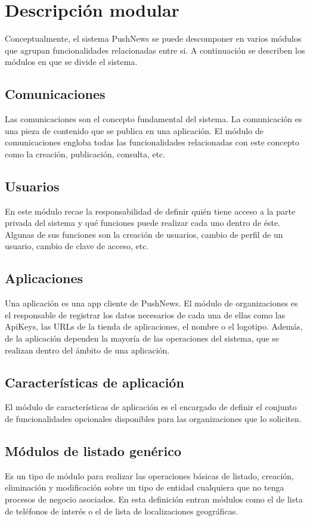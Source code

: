 \section{Descripción modular}
Conceptualmente, el sistema PushNews se puede descomponer en varios módulos que agrupan funcionalidades relacionadas entre si. A continuación se describen los módulos en que se divide el sistema.

\subsection{Comunicaciones}
Las comunicaciones son el concepto fundamental del sistema. La comunicación es una pieza de contenido que se publica en una aplicación. El módulo de comunicaciones engloba todas las funcionalidades relacionadas con este concepto como la creación, publicación, consulta, etc.

\subsection{Usuarios}
En este módulo recae la responsabilidad de definir quién tiene acceso a la parte privada del sistema y qué funciones puede realizar cada uno dentro de éste. Algunas de sus funciones son la creación de usuarios, cambio de perfil de un usuario, cambio de clave de acceso, etc.

\subsection{Aplicaciones}
Una aplicación es una app cliente de PushNews. El módulo de organizaciones es el responsable de registrar los datos necesarios de cada una de ellas como las ApiKeys, las URLs de la tienda de aplicaciones, el nombre o el logotipo. Además, de la aplicación dependen la mayoría de las operaciones del sistema, que se realizan dentro del ámbito de una aplicación.

\subsection{Características de aplicación}
El módulo de características de aplicación es el encargado de definir el conjunto de funcionalidades opcionales disponibles para las organizaciones que lo soliciten.

\subsection{Módulos de listado genérico}
Es un tipo de módulo para realizar las operaciones básicas de listado, creación, eliminación y modificación sobre un tipo de entidad cualquiera que no tenga procesos de negocio asociados. En esta definición entran módulos como el de lista de teléfonos de interés o el de lista de localizaciones geográficas.

